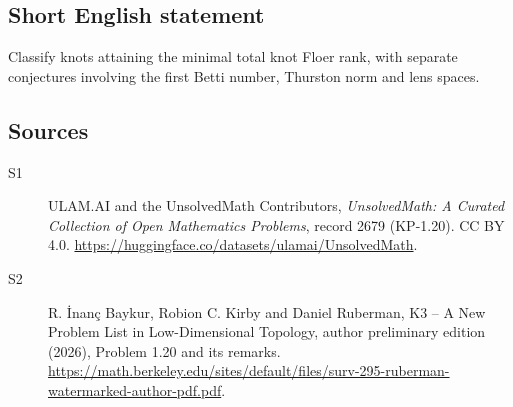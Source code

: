 \documentclass[11pt]{article}
\begin{document}
\subsection{Short English statement}
Classify knots attaining the minimal total knot Floer rank, with separate conjectures involving the first Betti number, Thurston norm and lens spaces.
\subsection{Sources}
\begin{description}
\item[\hypertarget{source:2679:1}{S1}] ULAM.AI and the UnsolvedMath Contributors, \emph{UnsolvedMath: A Curated Collection of Open Mathematics Problems}, record 2679 (KP-1.20). CC BY 4.0. \url{https://huggingface.co/datasets/ulamai/UnsolvedMath}.
\item[\hypertarget{source:2679:2}{S2}] R. \.{I}nan\c{c} Baykur, Robion C. Kirby and Daniel Ruberman, K3 -- A New Problem List in Low-Dimensional Topology, author preliminary edition (2026), Problem 1.20 and its remarks. \url{https://math.berkeley.edu/sites/default/files/surv-295-ruberman-watermarked-author-pdf.pdf}.
\end{description}
\label{end:2679}
\end{document}
